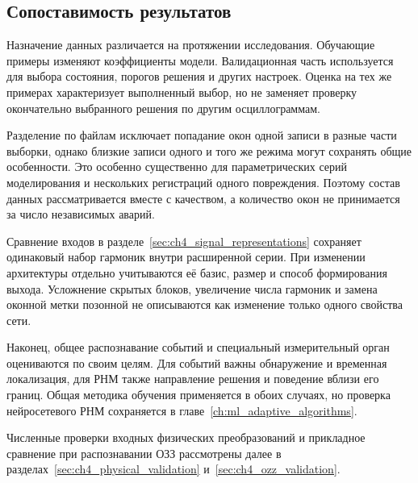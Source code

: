 {}

\subsection{Сопоставимость результатов}
\label{sec:ch4_training_comparability}


Назначение данных различается на протяжении исследования.
Обучающие примеры изменяют коэффициенты модели.
Валидационная часть используется для выбора состояния,
порогов решения и других настроек.
Оценка на тех же примерах характеризует выполненный выбор,
но не заменяет проверку окончательно выбранного решения
по другим осциллограммам.

Разделение по файлам исключает попадание окон одной записи
в разные части выборки, однако близкие записи одного
и того же режима могут сохранять общие особенности.
Это особенно существенно для параметрических серий
моделирования и нескольких регистраций одного повреждения.
Поэтому состав данных рассматривается вместе с качеством,
а количество окон не принимается за число независимых аварий.

Сравнение входов в разделе~\ref{sec:ch4_signal_representations}
сохраняет одинаковый набор гармоник внутри расширенной серии.
При изменении архитектуры отдельно учитываются её базис,
размер и способ формирования выхода.
Усложнение скрытых блоков, увеличение числа гармоник
и замена оконной метки позонной не описываются
как изменение только одного свойства сети.

Наконец, общее распознавание событий и специальный
измерительный орган оцениваются по своим целям.
Для событий важны обнаружение и временная локализация,
для РНМ также направление решения и поведение
вблизи его границ. Общая методика обучения применяется
в обоих случаях, но проверка нейросетевого РНМ
сохраняется в главе~\ref{ch:ml_adaptive_algorithms}.

Численные проверки входных физических преобразований
и прикладное сравнение при распознавании ОЗЗ
рассмотрены далее в разделах~\ref{sec:ch4_physical_validation}
и~\ref{sec:ch4_ozz_validation}.
